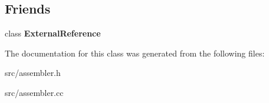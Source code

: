 \subsection*{Friends}
\begin{DoxyCompactItemize}
\item 
\hypertarget{classv8_1_1internal_1_1_cpu_features_a6cad52a007e84a78f169131b667e2d49}{}class {\bfseries External\+Reference}\label{classv8_1_1internal_1_1_cpu_features_a6cad52a007e84a78f169131b667e2d49}

\end{DoxyCompactItemize}


The documentation for this class was generated from the following files\+:\begin{DoxyCompactItemize}
\item 
src/assembler.\+h\item 
src/assembler.\+cc\end{DoxyCompactItemize}
